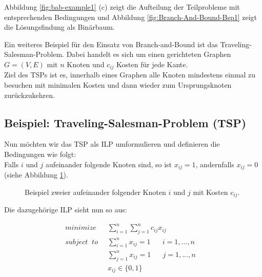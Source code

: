 \documentclass[tog]{acmsiggraph}
\begin{document}
Abbildung \ref{fig:bab-example1} (c) zeigt die Aufteilung der Teilprobleme mit entsprechenden Bedingungen und Abbildung \ref{fig:Branch-And-Bound-Bsp1} zeigt die Lösungsfindung als Binärbaum.

Ein weiteres Beispiel für den Einsatz von Branch-and-Bound ist das Traveling-Salesman-Problem. Dabei handelt es sich um einen gerichteten Graphen $G = (V,E)$ mit $n$ Knoten und $c_{ij}$ Kosten für jede Kante.\\
Ziel des TSPs ist es, innerhalb eines Graphen alle Knoten mindestens einmal zu besuchen mit minimalen Kosten und dann wieder zum Ursprungsknoten zurückzukehren.

\subsection*{Beispiel: Traveling-Salesman-Problem (TSP)} 

Nun möchten wir das TSP als ILP umformulieren und definieren die Bedingungen wie folgt:\\
Falls $i$ und $j$ aufeinander folgende Knoten sind, so ist $x_{ij} = 1$, andernfalls $x_{ij} = 0$ (siehe Abbildung \ref{fig:tsp-knoten}).

\begin{figure}[ht]
\centering
{}
\caption{Beispiel zweier aufeinander folgender Knoten $i$ und $j$ mit Kosten $c_{ij}$.}
\label{fig:tsp-knoten}
\end{figure}

Die dazugehörige ILP sieht nun so aus:

\large
\begin{align}
\label{Eq:TSP-Zuordnung}
minimize \;\; &\sum^{n}_{i=1}\sum^{n}_{j=1} c_{ij}x_{ij}& \nonumber \\
subject \;\; to \;\; &\sum^{n}_{i=1}x_{ij} = 1 \;\;\;\;\;\;i = 1,...,n \nonumber \\
&\sum^{n}_{j=1}x_{ij} = 1 \;\;\;\;\;\;j = 1,...,n \nonumber \\
& x_{ij} \in \{0, 1\}
\end{align}
\normalsize
\end{document}
